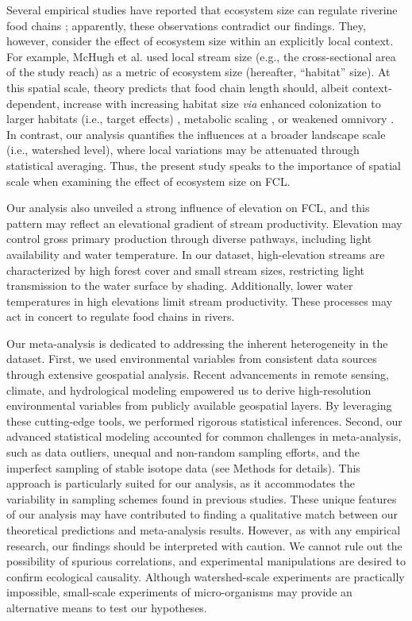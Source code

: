 \documentclass[11pt, class=article, crop=false]{standalone}
\begin{document}
Several empirical studies have reported that ecosystem size can regulate riverine food chains \citep{mchugh_dual_2010, sabo_role_2010};  apparently, these observations contradict our findings.
They, however, consider the effect of ecosystem size within an explicitly local context.
For example, McHugh et al. \citep{mchugh_dual_2010} used local stream size (e.g., the cross-sectional area of the study reach) as a metric of ecosystem size (hereafter, ``habitat'' size).
At this spatial scale, theory predicts that food chain length should, albeit context-dependent, increase with increasing habitat size \textit{via} enhanced colonization to larger habitats (i.e., target effects) \citep{shibasaki_food_2024}, metabolic scaling \citep{mcintosh_capacity_2018}, or weakened omnivory \citep{ward_mechanistic_2017}.
In contrast, our analysis quantifies the influences at a broader landscape scale (i.e., watershed level), where local variations may be attenuated through statistical averaging. 
Thus, the present study speaks to the importance of spatial scale when examining the effect of ecosystem size on FCL.

Our analysis also unveiled a strong influence of elevation on FCL, and this pattern may reflect an elevational gradient of stream productivity.
Elevation may control gross primary production through diverse pathways, including light availability and water temperature.
In our dataset, high-elevation streams are characterized by high forest cover and small stream sizes, restricting light transmission to the water surface by shading.
Additionally, lower water temperatures in high elevations limit stream productivity.
These processes may act in concert to regulate food chains in rivers.

Our meta-analysis is dedicated to addressing the inherent heterogeneity in the dataset.
First, we used environmental variables from consistent data sources through extensive geospatial analysis.
Recent advancements in remote sensing, climate, and hydrological modeling empowered us to derive high-resolution environmental variables from publicly available geospatial layers.
By leveraging these cutting-edge tools, we performed rigorous statistical inferences. 
Second, our advanced statistical modeling accounted for common challenges in meta-analysis, such as data outliers, unequal and non-random sampling efforts, and the imperfect sampling of stable isotope data (see Methods for details).
This approach is particularly suited for our analysis, as it accommodates the variability in sampling schemes found in previous studies.
These unique features of our analysis may have contributed to finding a qualitative match between our theoretical predictions and meta-analysis results.
However, as with any empirical research, our findings should be interpreted with caution.
We cannot rule out the possibility of spurious correlations, and experimental manipulations are desired to confirm ecological causality.
Although watershed-scale experiments are practically impossible, small-scale experiments of micro-organisms may provide an alternative means to test our hypotheses.
\end{document}
